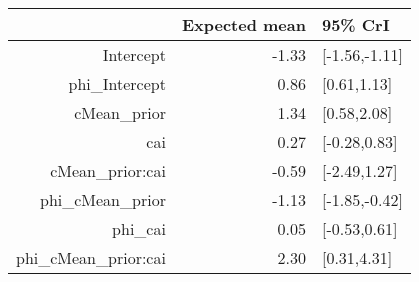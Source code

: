 \begin{tabular}{rrl}
  \hline
 & Expected mean & 95\% CrI \\ 
  \hline
Intercept & -1.33 & [-1.56,-1.11] \\ 
  phi\_Intercept & 0.86 & [0.61,1.13] \\ 
  cMean\_prior & 1.34 & [0.58,2.08] \\ 
  cai & 0.27 & [-0.28,0.83] \\ 
  cMean\_prior:cai & -0.59 & [-2.49,1.27] \\ 
  phi\_cMean\_prior & -1.13 & [-1.85,-0.42] \\ 
  phi\_cai & 0.05 & [-0.53,0.61] \\ 
  phi\_cMean\_prior:cai & 2.30 & [0.31,4.31] \\ 
   \hline
\end{tabular}

